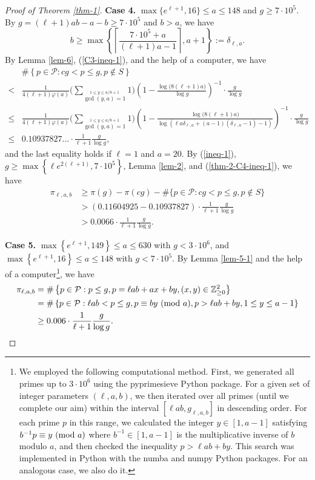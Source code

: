 \documentclass[12pt,a4paper,reqno]{amsart}
\numberwithin{equation}{section}
\def\Z{{\mathbb Z}}
\def\pmod #1{\ ({\rm{mod}}\ #1)}
\def\cP{{\mathcal P}}
\theoremstyle{plain}
\theoremstyle{definition}
\begin{document}
\begin{proof}[Proof of Theorem \ref{thm-1}]
	\textbf{Case 4.} $\max\{e^{\ell+1},16\}\leq a\leq 148$ and $g\geq 7\cdot 10^{5}$.
	By $g=(\ell+1) ab-a-b\geq 7\cdot 10^{5}$ and $b>a$, we have 
	$$
	b\geq \max\left\{\left\lceil \frac{7\cdot 10^{5}+a}{(\ell+1)a-1} \right\rceil, a+1 \right\}
	:=\delta_{\ell,a}.
	$$
	By Lemma \ref{lem-6}, (\ref{C3-ineq-1}), and the help of a computer, we have 
	\begin{align}
		&\#\left\{p\in\cP:cg< p\leq g, p\notin S \right\}\nonumber\\
		<& \frac{1}{4(\ell+1)\varphi(a)} \Bigg(\sum_{\stackrel{1\leq y\leq a/8+1}{\gcd(y,a)=1} }1\Bigg) \left( 1-\frac{\log \big(8(\ell+1)a\big)}{\log g}\right)^{-1}\cdot \frac{g}{\log g}\nonumber\\
		\leq & \frac{1}{4(\ell+1)\varphi(a)} \Bigg(\sum_{\stackrel{1\leq y\leq a/8+1}{\gcd(y,a)=1} }1\Bigg) \left( 1-\frac{\log\big(8(\ell+1)a\big)}{\log \left(\ell a\delta_{\ell,a} +(a-1)(\delta_{\ell,a}-1)-1 \right)} \right)^{-1}\cdot \frac{g}{\log g}\nonumber\\
		\leq & 0.10937827\ldots\cdot \frac{1}{\ell+1}\frac{g}{\log g}, \label{thm-2-C4-ineq-1}
	\end{align}
	and the last equality holds if $\ell=1$ and $a=20$.
	By (\ref{ineq-1}), $g \geq \max\left\{\ell e^{2(\ell+1)}, 7\cdot 10^{5}\right\}$, Lemma \ref{lem-2}, and (\ref{thm-2-C4-ineq-1}), we have
	\begin{align*}
		\pi_{\ell,a,b}
		&\geq \pi(g)-\pi(cg)-\#\{p\in\mathcal{P}: cg< p\leq g, p\notin S\}\\
		&> (0.11604925- 0.10937827)\cdot \frac{1}{\ell+1}\frac{g}{\log g}\\
		&> 0.0066 \cdot \frac{1}{\ell+1}\frac{g}{\log g}.
	\end{align*}
	
	\textbf{Case 5.} $\max\left\{e^{\ell+1},149\right\}\leq a\leq 630$ with $g<3\cdot 10^{6}$, and $\max\left\{e^{\ell+1},16\right\}\leq a\leq 148$ with $g<7\cdot 10^{5}$. By Lemma \ref{lem-5-1} and the help of a computer\footnote{We employed the following computational method. First, we generated all primes up to $3 \cdot 10^6$ using the pyprimesieve Python package. For a given set of integer parameters $(\ell, a, b)$, we then iterated over all primes (until we complete our aim) within the interval $[\ell ab, g_{\ell, a,b}]$ in descending order. For each prime $p$ in this range, we calculated the integer $y\in [1,a-1]$ satisfying $b^{-1} p \equiv y \pmod{a}$ where $b^{-1}\in[1,a-1]$ is the multiplicative inverse of $b$ modulo $a$, and then checked the inequality $p > \ell ab + b y$. This search was implemented in Python with the numba and numpy Python packages. For an analogous case, we also do it.}, we have 
	\begin{align*}
		\pi_{\ell,a,b}
		&= \#\left\{p\in\cP : p\leq g,p=\ell ab+ax+by,(x,y)\in \Z_{\geq 0}^{2}\right\}\nonumber\\
		&= \#\left\{p\in \mathcal{P}: \ell ab< p\leq g,p\equiv by \pmod{a}, p>\ell ab+by, 1\leq y\leq a-1\right\}\nonumber\\
		&\geq 0.006 \cdot \frac{1}{\ell+1}\frac{g}{\log g}.
	\end{align*}


\end{proof}
\end{document}
